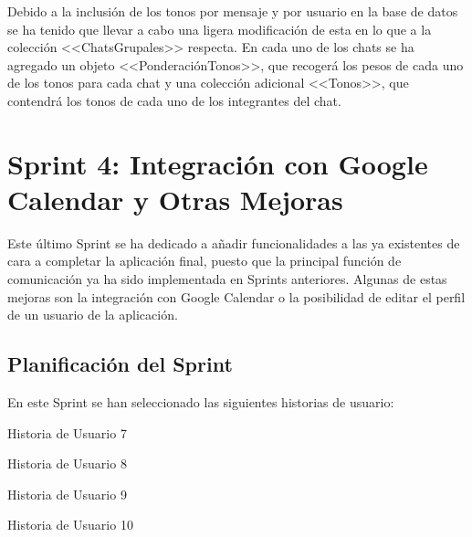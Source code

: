 Debido a la inclusión de los tonos por mensaje y por usuario en la base de datos se ha tenido que llevar a cabo una ligera modificación de esta en lo que a la colección \mbox{<<ChatsGrupales>>} respecta. En cada uno de los chats se ha agregado un objeto <<PonderaciónTonos>>, que recogerá los pesos de cada uno de los tonos para cada chat y una colección adicional <<Tonos>>, que contendrá los tonos de cada uno de los integrantes del chat.

\clearpage


\section{Sprint 4: Integración con Google Calendar y Otras Mejoras}
Este último Sprint se ha dedicado a añadir funcionalidades a las ya existentes de cara a completar la aplicación final, puesto que la principal función de comunicación ya ha sido implementada en Sprints anteriores. Algunas de estas mejoras son la integración con Google Calendar o la posibilidad de editar el perfil de un usuario de la aplicación.

\subsection{Planificación del Sprint}
En este Sprint se han seleccionado las siguientes historias de usuario:

\begin{table}[hp]
	\centering
	{\small
		
	}
	\caption[Historia de Usuario 7]
	{Historia de Usuario 7}
	\label{tab:historia7}
\end{table}

\begin{table}[hp]
	\centering
	{\small
		
	}
	\caption[Historia de Usuario 8]
	{Historia de Usuario 8}
	\label{tab:historia8}
\end{table}

\clearpage

\begin{table}[hp]
	\centering
	{\small
		
	}
	\caption[Historia de Usuario 9]
	{Historia de Usuario 9}
	\label{tab:historia9}
\end{table}

\begin{table}[!htbp]
	\centering
	{\small
		
	}
	\caption[Historia de Usuario 10]
	{Historia de Usuario 10}
	\label{tab:historia10}
\end{table}

